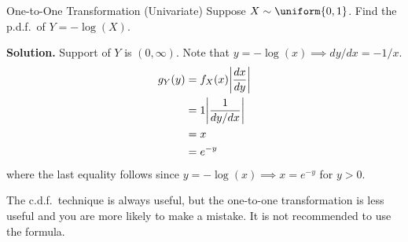 \begin{Example}{One-to-One Transformation (Univariate)}{}
    Suppose $ X \sim \uniform{0,1} $. Find the p.d.f.\ of $ Y=-\log(X) $.

    \textbf{Solution.} Support of $ Y $ is $ (0,\infty) $.
    Note that $ y=-\log(x)\implies dy/dx=-1/x $.
    \begin{align*}
        g_Y(y)
         & =f_X(x)\abs*{\frac{dx}{dy}} \\
         & =1\abs*{\frac{1}{dy/dx}}    \\
         & =x                          \\
         & =e^{-y}
    \end{align*}
    where the last equality follows since
    $ y=-\log(x)\implies x=e^{-y} $ for $ y>0 $.
\end{Example}
\begin{Remark}{}{}
    The c.d.f.\ technique is always useful, but the
    one-to-one transformation is less useful
    and you are more likely to make a mistake.
    It is not recommended to use the formula.
\end{Remark}
